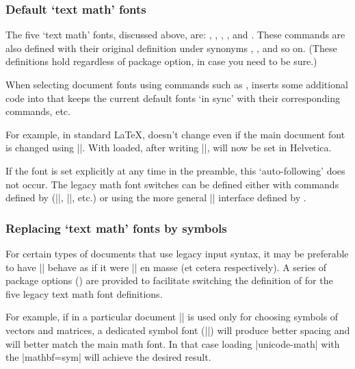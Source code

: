 \subsubsection{Default `text math' fonts}

The five `text math' fonts, discussed above, are: , , , , and .
These commands are also defined with their original definition under synonyms , , and so on.
(These definitions hold regardless of package option, in case you need to be sure.)

When selecting document fonts using  commands such as ,  inserts some additional code into  that keeps the current default fonts `in sync' with their corresponding  commands, etc.

For example, in standard \LaTeX,  doesn't change even if the main document font is changed using |\renewcommand\sfdefault{...}|. With  loaded, after writing |\setsansfont{Helvetica}|,  will now be set in Helvetica.

If the  font is set explicitly at any time in the preamble, this `auto-following' does not occur. The legacy math font switches can be defined either with commands defined by  (|\setmathrm|, |\setmathsf|, etc.) or using the more general |\setmathfontface\mathsf| interface defined by .


\subsubsection{Replacing `text math' fonts by symbols}

For certain types of documents that use legacy input syntax, it may be preferable to have |\mathbf| behave as if it were |\symbf| en masse (et cetera respectively).
A series of package options () are provided to facilitate switching the definition of  for the five legacy text math font definitions.

For example, if in a particular document |\mathbf| is used only for choosing symbols of vectors and matrices, a dedicated symbol font (|\symbf|) will produce better spacing and will better match the main math font.
In that case loading |unicode-math| with the |mathbf=sym| will achieve the desired result.

